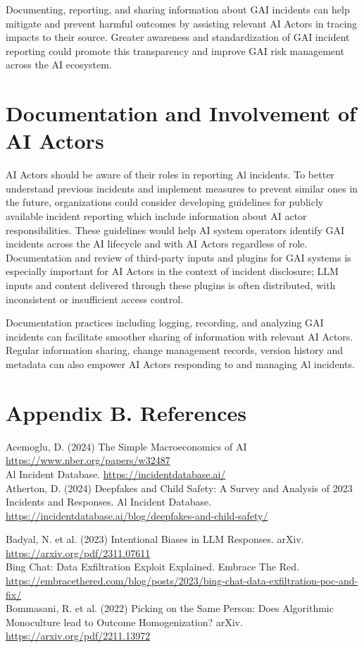 \documentclass[10pt]{article}
\begin{document}
Documenting, reporting, and sharing information about GAI incidents can help mitigate and prevent harmful outcomes by assisting relevant AI Actors in tracing impacts to their source. Greater awareness and standardization of GAI incident reporting could promote this transparency and improve GAI risk management across the AI ecosystem.
\section*{Documentation and Involvement of AI Actors}
AI Actors should be aware of their roles in reporting Al incidents. To better understand previous incidents and implement measures to prevent similar ones in the future, organizations could consider developing guidelines for publicly available incident reporting which include information about AI actor responsibilities. These guidelines would help AI system operators identify GAI incidents across the AI lifecycle and with AI Actors regardless of role. Documentation and review of third-party inputs and plugins for GAI systems is especially important for AI Actors in the context of incident disclosure; LLM inputs and content delivered through these plugins is often distributed, with inconsistent or insufficient access control.

Documentation practices including logging, recording, and analyzing GAI incidents can facilitate smoother sharing of information with relevant AI Actors. Regular information sharing, change management records, version history and metadata can also empower AI Actors responding to and managing Al incidents.
\section*{Appendix B. References}
Acemoglu, D. (2024) The Simple Macroeconomics of AI \href{https://www.nber.org/papers/w32487}{https://www.nber.org/papers/w32487}\\
Al Incident Database. \href{https://incidentdatabase.ai/}{https://incidentdatabase.ai/}\\
Atherton, D. (2024) Deepfakes and Child Safety: A Survey and Analysis of 2023 Incidents and Responses. Al Incident Database. \href{https://incidentdatabase.ai/blog/deepfakes-and-child-safety/}{https://incidentdatabase.ai/blog/deepfakes-and-child-safety/}

Badyal, N. et al. (2023) Intentional Biases in LLM Responses. arXiv. \href{https://arxiv.org/pdf/2311.07611}{https://arxiv.org/pdf/2311.07611}\\
Bing Chat: Data Exfiltration Exploit Explained. Embrace The Red.\\
\href{https://embracethered.com/blog/posts/2023/bing-chat-data-exfiltration-poc-and-fix/}{https://embracethered.com/blog/posts/2023/bing-chat-data-exfiltration-poc-and-fix/}\\
Bommasani, R. et al. (2022) Picking on the Same Person: Does Algorithmic Monoculture lead to Outcome Homogenization? arXiv. \href{https://arxiv.org/pdf/2211.13972}{https://arxiv.org/pdf/2211.13972}
\end{document}
